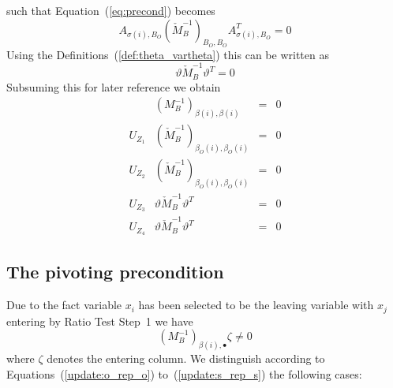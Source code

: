 \documentclass[a4paper]{article}
\begin{document}
such that Equation~(\ref{eq:precond}) becomes 
\begin{equation*}
A_{\sigma(i), B_{O}}\left(\check{M}_{B}^{-1}\right)_{B_{O}, B_{O}}
A_{\sigma(i), B_{O}}^{T} =0
\end{equation*}
Using the Definitions~(\ref{def:theta_vartheta}) this can be written as
\begin{equation}
\label{eq:precond_simplified}
\vartheta\check{M}_{B}^{-1}\vartheta^{T}=0
\end{equation}
Subsuming this for later reference we obtain 
\begin{equation}
\label{table:leaving_precond}
\begin{array}{c|ccc}
 & 
\left(M_{B}^{-1}\right)_{\beta(i), \beta(i)}
&=& 0
 \\
\hline
U_{Z_{1}}
&
\left(\check{M}_{B}^{-1}\right)_{\beta_{O}(i), \beta_{O}(i)}
&=& 0
 \\
U_{Z_{2}}
&
\left(\check{M}_{B}^{-1}\right)_{\beta_{O}(i), \beta_{O}(i)}
&=& 0
 \\
U_{Z_{3}}
&
\vartheta\check{M}_{B}^{-1}
\vartheta^{T}
&=& 0
 \\
U_{Z_{4}}
&
\vartheta\check{M}_{B}^{-1}\vartheta^{T}
&=& 0
\end{array}
\end{equation}

\subsection{The pivoting precondition}
Due to the fact variable $x_{i}$ has been selected to be the leaving variable with $x_{j}$ entering by Ratio Test Step~1 we have
\begin{equation}
\label{precond:pivot}
\left(M_{B}^{-1}\right)_{\beta(i), \bullet}\zeta \neq 0
\end{equation}
where $\zeta$ denotes the entering column. 
We distinguish according to Equations~(\ref{update:o_rep_o})
to~(\ref{update:s_rep_s}) the following cases:
\end{document}
